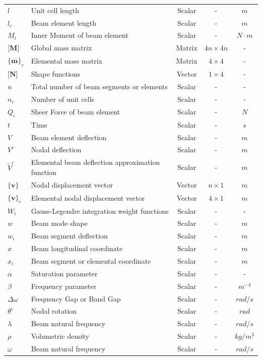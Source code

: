 \begin{longtable}{llccc}
    $l$     & Unit cell length & Scalar & - & $m$ \\
    $l_e$   & Beam element length & Scalar & - & $m$ \\
    $M_i$   & Inner Moment of beam element & Scalar & - & $N\cdot m$ \\
    $\textbf{[M]}$
            & Global mass matrix & Matrix & $4n\times 4n$ & - \\
    $\{\textbf{m}\}_e$
            & Elemental mass matrix & Matrix & $4\times 4$ & - \\
    $\textbf{[N]}$
            & Shape functions & Vector & $1\times 4$ & - \\
    $n$     & Total number of beam segments or elements & Scalar & - & - \\
    $n_c$   & Number of unit cells & Scalar & - & - \\
    $Q_i$   & Sheer Force of beam element & Scalar & - & $N$ \\
    $t$     & Time & Scalar & - & $s$ \\
    $V$     & Beam element deflection & Scalar & - & $m$ \\
    $V^e$   & Nodal deflection & Scalar & - & $m$ \\
    $\tilde{V}^e$
            & Elemental beam deflection approximation function & Scalar & - & $m$ \\
    $\{\textbf{v}\}$
            & Nodal displacement vector & Vector & $n\times 1$ & $m$ \\
    $\{\textbf{v}\}_e$
            & Elemental nodal displacement vector & Vector & $4\times 1$ & $m$ \\
    $W_i$     & Gauss-Legendre integration weight functions & Scalar & - & - \\
    $w$     & Beam mode shape & Scalar & - & $m$ \\
    $w_i$   & Beam segment deflection & Scalar & - & $m$ \\
    $x$     & Beam longitudinal coordinate & Scalar & - & $m$ \\
    $x_i$   & Beam segment or elemental coordinate & Scalar & - & $m$ \\
    $\alpha$
            & Saturation parameter & Scalar & - & - \\
    $\beta$ & Frequency parameter & Scalar & - & $m^{-4}$ \\
    $\Delta\omega$
            & Frequency Gap or Band Gap & Scalar & - & $rad/s$ \\
    $\theta^e$
            & Nodal rotation & Scalar & - & $rad$ \\
    $\lambda$
            & Beam natural frequency & Scalar & - & $rad/s$ \\
    $\rho$  & Volumetric density & Scalar & - & $kg/m^3$ \\
    $\omega$
            & Beam natural frequency & Scalar & - & $rad/s$ \\
\end{longtable}
\setcounter{table}{0}
